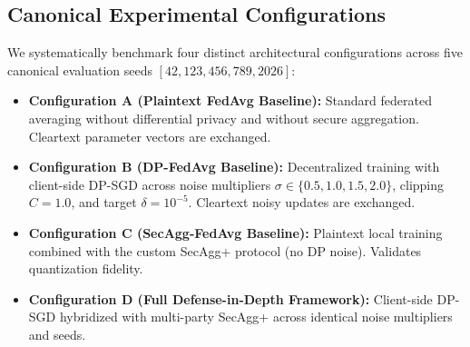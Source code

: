 \documentclass[journal,twocolumn,10pt]{IEEEtran}
\begin{document}
\subsection{Canonical Experimental Configurations}
We systematically benchmark four distinct architectural configurations across five canonical evaluation seeds $[42, 123, 456, 789, 2026]$:
\begin{itemize}
    \item \textbf{Configuration A (Plaintext FedAvg Baseline):} Standard federated averaging without differential privacy and without secure aggregation. Cleartext parameter vectors are exchanged.
    \item \textbf{Configuration B (DP-FedAvg Baseline):} Decentralized training with client-side DP-SGD across noise multipliers $\sigma \in \{0.5, 1.0, 1.5, 2.0\}$, clipping $C = 1.0$, and target $\delta = 10^{-5}$. Cleartext noisy updates are exchanged.
    \item \textbf{Configuration C (SecAgg-FedAvg Baseline):} Plaintext local training combined with the custom SecAgg+ protocol (no DP noise). Validates quantization fidelity.
    \item \textbf{Configuration D (Full Defense-in-Depth Framework):} Client-side DP-SGD hybridized with multi-party SecAgg+ across identical noise multipliers and seeds.
\end{itemize}
\end{document}

